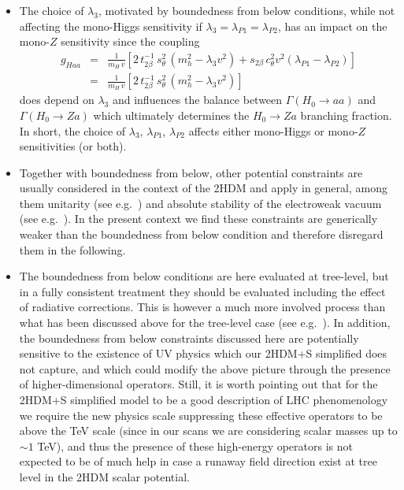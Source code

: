 \begin{itemize}
    \begin{itemize}
     \item The choice of $\lambda_3$, motivated by boundedness from below conditions, while not affecting the mono-Higgs sensitivity 
    if $\lambda_3 = \lambda_{P1} = \lambda_{P2}$, has an impact on the mono-$Z$ sensitivity since the coupling 
    \begin{eqnarray}
     g_{Haa} &=& \frac{1}{m_{H} \,v} \left[ 2\, t_{2\beta}^{-1}\, s_{\theta}^2\, 
(m_h^2 - \lambda_3 v^2) + s_{2\beta}\, c_{\theta}^2 v^2 (\lambda_{P1} - \lambda_{P2}) \right] \nonumber \\
      &=& \frac{1}{m_{H} \,v} \left[ 2\, t_{2\beta}^{-1}\, s_{\theta}^2\, 
(m_h^2 - \lambda_3 v^2) \right] 
    \end{eqnarray}
    does depend on $\lambda_3$ and influences the balance between $\Gamma(H_0 \to aa)$ and $\Gamma(H_0 \to Za)$ which ultimately determines the 
    $H_0 \to Za$ branching fraction. In short, the choice of $\lambda_3$, $\lambda_{P1}$, $\lambda_{P2}$ affects either mono-Higgs or mono-$Z$ sensitivities
    (or both).
    
    \item Together with boundedness from below, other potential constraints are usually considered in the context of the 2HDM and apply in general, 
    among them unitarity (see e.g.~\cite{Ginzburg:2005dt,Grinstein:2015rtl}) and absolute stability of the electroweak vacuum (see e.g.~\cite{Barroso:2013awa}). 
    In the present context we find these constraints 
    are generically weaker than the boundedness from below condition and therefore disregard them in the following. 
    
    \item The boundedness from below conditions are here evaluated at tree-level, but in a fully consistent treatment 
    they should be evaluated including the effect of radiative corrections. This is however 
    a much more involved process than what has been discussed above for the 
    tree-level case (see e.g.~\cite{Staub:2017ktc}). In addition, 
    the boundedness from below constraints discussed here are potentially sensitive to the 
    existence of UV physics which our 2HDM+S simplified does not capture, and which could modify the above picture through the presence of higher-dimensional 
    operators. Still, it is worth pointing out that for the 2HDM+S simplified model to be a good description of LHC phenomenology we require 
    the new physics scale suppressing these effective operators to be above the TeV scale (since in our scans we are considering scalar masses up to $\sim 1$ TeV), 
    and thus the presence of these high-energy operators is not expected to be of much help in case a runaway field direction exist at tree level in the 2HDM scalar 
    potential.
    \end{itemize}
    
    
    
    
\end{itemize}


